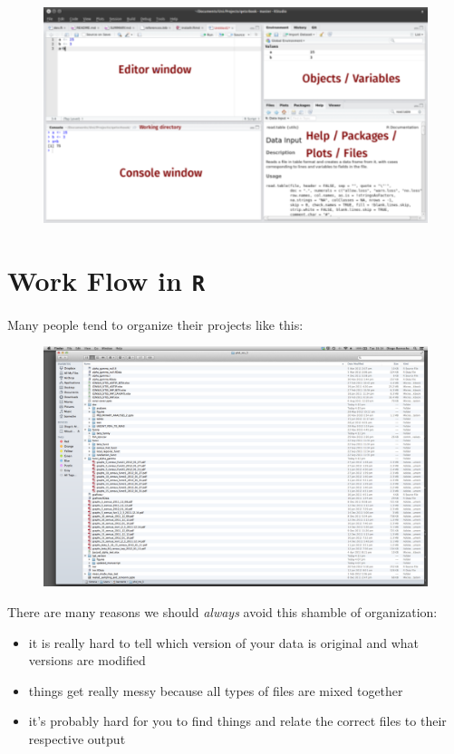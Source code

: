\documentclass[]{article}
\providecommand{\tightlist}{%
  \setlength{\itemsep}{0pt}\setlength{\parskip}{0pt}}
\begin{document}
\begin{figure}
\centering
\includegraphics{images/rstudio.png}
\caption{}
\end{figure}

\newpage 

\section{\texorpdfstring{Work Flow in
\texttt{R}}{Work Flow in R}}\label{work-flow-in-r}

Many people tend to organize their projects like this:

\begin{figure}
\centering
\includegraphics{images/bad_layout.png}
\caption{}
\end{figure}

There are many reasons we should \emph{always} avoid this shamble of
organization:

\begin{itemize}
\tightlist
\item
  it is really hard to tell which version of your data is original and
  what versions are modified\\
\item
  things get really messy because all types of files are mixed
  together\\
\item
  it's probably hard for you to find things and relate the correct files
  to their respective output
\end{itemize}
\end{document}
